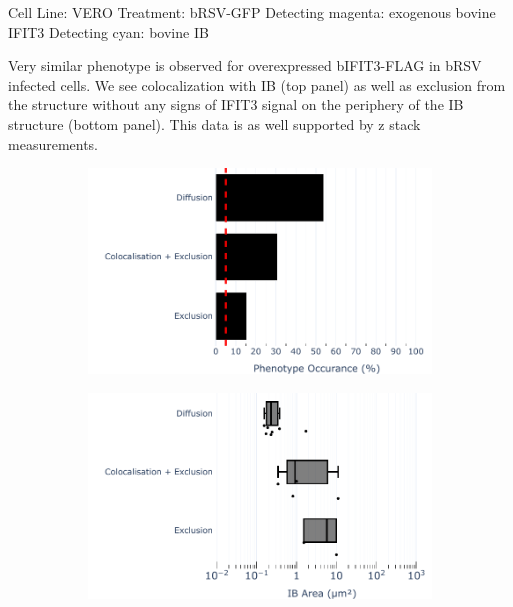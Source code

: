 Cell Line: VERO \newline
Treatment: bRSV-GFP \newline
Detecting magenta: exogenous bovine IFIT3 \newline
Detecting cyan: bovine IB \newline

Very similar phenotype is observed for overexpressed bIFIT3-FLAG in bRSV infected cells. We see colocalization with IB (top panel) as well as exclusion from the structure without any signs of IFIT3 signal on the periphery of the IB structure (bottom panel). This data is as well supported by z stack measurements.

\begin{figure}
    \begin{subfigure}{0.5\textwidth}
        \caption{}
        \includegraphics[width=1\linewidth]{09. Chapter 4/Figs/04. Overexpression/02. IFIT3/04. bar_i3_brsv.pdf} 
    \end{subfigure}
    \begin{subfigure}{0.5\textwidth}
        \caption{}
        \includegraphics[width=1\linewidth]{09. Chapter 4/Figs/04. Overexpression/02. IFIT3/05. box_i3_brsv.pdf}

\end{subfigure}
\end{figure}
